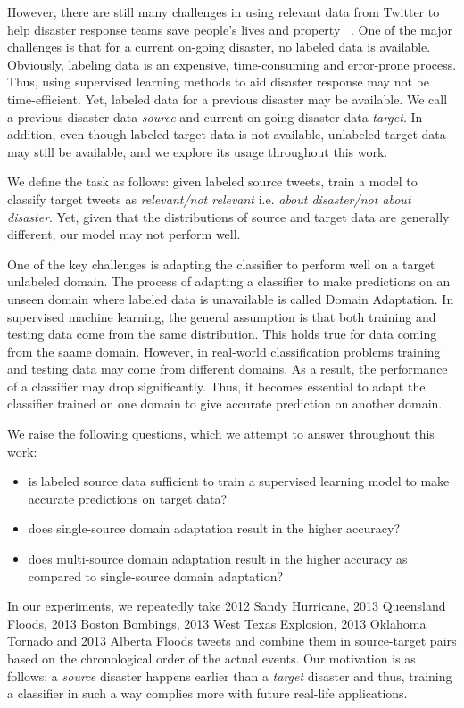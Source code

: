 However, there are still many challenges in using relevant data from Twitter to help disaster response teams save people’s lives and property ~\citep{mendoza}. One of the major challenges is that for a current on-going disaster, no labeled data is available. Obviously, labeling data is an expensive, time-consuming and error-prone process. Thus, using supervised learning methods to aid disaster response may not be time-efficient. Yet, labeled data for a previous disaster may be available. We call a previous disaster data \textit{source} and current on-going disaster data \textit{target}. In addition, even though labeled target data is not available, unlabeled target data may still be available, and we explore its usage throughout this work.

We define the task as follows: given labeled source tweets, train a model to classify target tweets as \textit{relevant/not relevant} i.e. \textit{about disaster/not about disaster}. Yet, given that the distributions of source and target data are generally different, our model may not perform well. 

One of the key challenges is adapting the classifier to perform well on a target unlabeled domain. The process of adapting a classifier to make predictions on an unseen domain where labeled data is unavailable is called Domain Adaptation. In supervised machine learning, the general assumption is that both training and testing data come from the same distribution. This holds true for data coming from the saame domain. However, in real-world classification problems training and testing data may come from different domains. As a result, the performance of a classifier may drop significantly. Thus, it becomes essential to adapt the classifier trained on one domain to give accurate prediction on another domain. 

We raise the following questions, which we attempt to answer throughout this work:

\begin{itemize}
  \item is labeled source data sufficient to train a supervised learning model to make accurate predictions on target data?
  \item does single-source domain adaptation result in the higher accuracy?
  \item does multi-source domain adaptation result in the higher accuracy as compared to single-source domain adaptation?
\end{itemize}

In our experiments, we repeatedly take 2012 Sandy Hurricane, 2013 Queensland Floods, 2013 Boston Bombings, 2013 West Texas Explosion, 2013 Oklahoma Tornado and 2013 Alberta Floods tweets and combine them in source-target pairs based on the chronological order of the actual events. Our motivation is as follows: a \textit{source} disaster happens earlier than a \textit{target} disaster and thus, training a classifier in such a way complies more with future real-life applications.